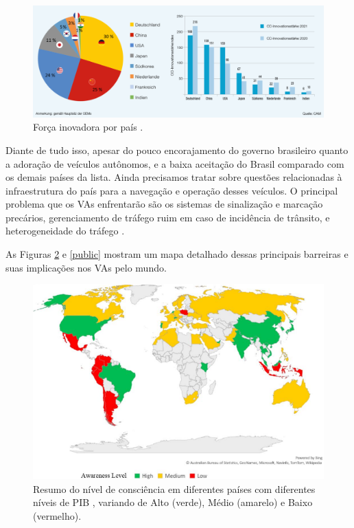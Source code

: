 \begin{figure}[H]
\centering
\includegraphics[width=12cm]{Figures/CCI.jpg}
\caption{Força inovadora por país  \cite{CCI}.}
\label{forcaCCI}
\end{figure}


Diante de tudo isso, apesar do pouco encorajamento do governo brasileiro quanto a adoração de veículos autônomos, e a baixa aceitação do Brasil comparado com os demais países da lista. Ainda precisamos tratar sobre questões relacionadas à infraestrutura do país para a navegação e operação desses veículos. 
O principal problema que os VAs enfrentarão são os sistemas de sinalização e marcação precários, gerenciamento de tráfego ruim em caso de incidência de trânsito, e heterogeneidade do tráfego \cite{mundobrasil}.

As Figuras \ref{awareness} e \ref{public} mostram um mapa detalhado dessas principais barreiras e suas implicações nos VAs pelo mundo.
\begin{figure}[H]
\centering
\includegraphics[width=12cm]{Figures/grafik-a.png}
\caption{Resumo do nível de consciência em diferentes países com diferentes níveis de PIB \cite{mundobrasil}, variando de Alto (verde), Médio (amarelo) e Baixo (vermelho).}
\label{awareness}
\end{figure}


